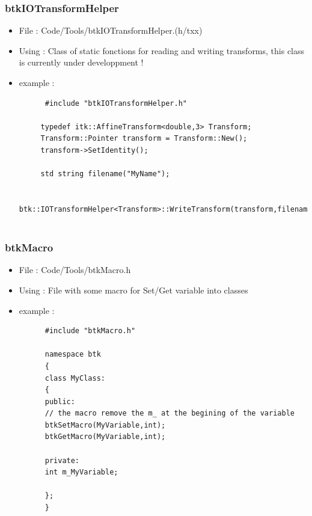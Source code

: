     \subsubsection{btkIOTransformHelper}
    \begin{itemize}
    \item File : Code/Tools/btkIOTransformHelper.(h/txx)
    \item Using : Class of static fonctions for reading and writing transforms, this class is currently under developpment !
    \item example :
      \begin{verbatim}
      #include "btkIOTransformHelper.h"

     typedef itk::AffineTransform<double,3> Transform;
     Transform::Pointer transform = Transform::New();
     transform->SetIdentity();

     std string filename("MyName");

     btk::IOTransformHelper<Transform>::WriteTransform(transform,filename);
      
      \end{verbatim}

    \end{itemize}

    \subsubsection{btkMacro}
    \begin{itemize}
    \item File : Code/Tools/btkMacro.h
    \item Using : File with some macro for Set/Get variable into classes
    \item example :
      \begin{verbatim}
      #include "btkMacro.h"

      namespace btk
      {
      class MyClass:
      {
      public:
      // the macro remove the m_ at the begining of the variable
      btkSetMacro(MyVariable,int); 
      btkGetMacro(MyVariable,int);

      private:
      int m_MyVariable;

      };
      }

      \end{verbatim}


    \end{itemize}
